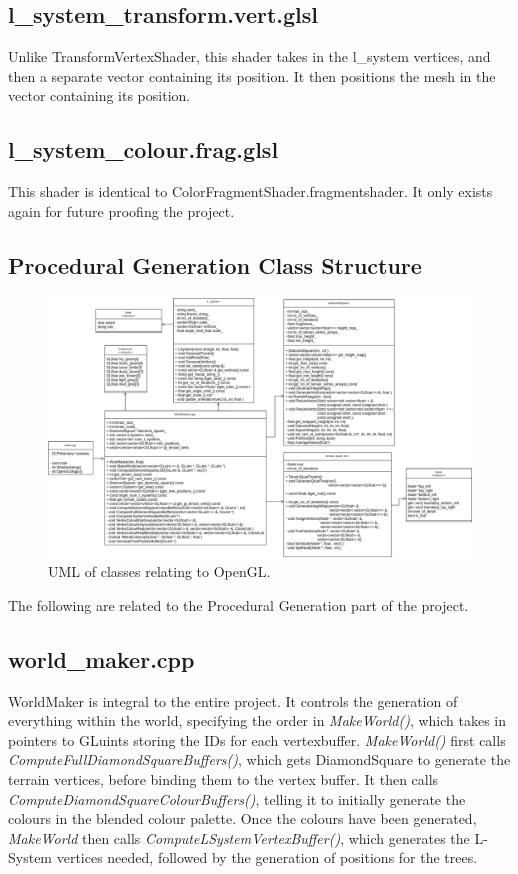\documentclass[a4paper,10pt]{report}
\begin{document}
\subsection{l\_system\_transform.vert.glsl}
Unlike TransformVertexShader, this shader takes in the l\_system vertices, and then a separate vector containing its position. It then positions the mesh in the vector containing its position.


\subsection{l\_system\_colour.frag.glsl}
This shader is identical to ColorFragmentShader.fragmentshader. It only exists again for future proofing the project. 


\clearpage
\subsection{Procedural Generation Class Structure}

\begin{figure}[h!]
\centering
  \includegraphics[width=1\textwidth]{Images/Charts/GenerationUML.png}
 \caption{UML of classes relating to OpenGL.}
 \label{fig:GenerationUML}
\end{figure}

The following are related to the Procedural Generation part of the project.

\subsection{world\_maker.cpp}
WorldMaker is integral to the entire project. It controls the generation of everything within the world, specifying the order in \textit{MakeWorld()}, which takes in pointers to GLuints storing the IDs for each vertexbuffer. \textit{MakeWorld()} first calls \textit{ComputeFullDiamondSquareBuffers()}, which gets DiamondSquare to generate the terrain vertices, before binding them to the vertex buffer. It then calls \textit{ComputeDiamondSquareColourBuffers()}, telling it to initially generate the colours in the blended colour palette. Once the colours have been generated, \textit{MakeWorld} then calls \textit{ComputeLSystemVertexBuffer()}, which generates the L-System vertices needed, followed by the generation of positions for the trees.
\end{document}
